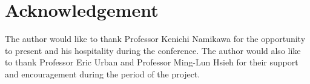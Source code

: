 \documentclass[leqno]{amsart}
\theoremstyle{definition}
\theoremstyle{remark}
\begin{document}
\section*{Acknowledgement}

The author would like to thank Professor Kenichi Namikawa
for the opportunity to present 
and his hospitality during the conference.
The author would also like to thank Professor Eric Urban
and Professor Ming-Lun Hsieh for their support and encouragement
during the period of the project.










\end{document}
